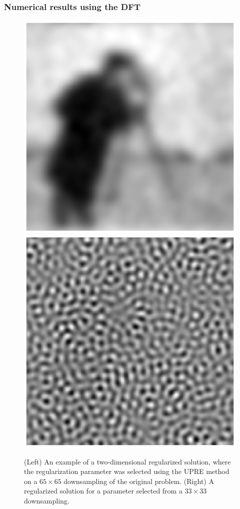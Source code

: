 \documentclass[t]{beamer}
\begin{document}
\begin{frame}
\frametitle{Numerical results using the DFT}
\begin{figure}
\centering
\includegraphics[scale=0.42]{Figures/UPRE_Solution_DFT_2D.eps}
\includegraphics[scale=0.42]{Figures/UPRE_SolutionFail_DFT_2D.eps}
\caption{(Left) An example of a two-dimensional regularized solution, where the regularization parameter was selected using the UPRE method on a $65 \times 65$ downsampling of the original problem. (Right) A regularized solution for a parameter selected from a $33 \times 33$ downsampling.}
\end{figure}
\end{frame}
\end{document}
